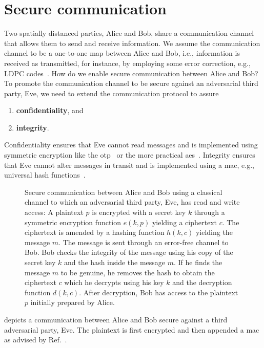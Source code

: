 \section{Secure communication}

Two spatially distanced parties, Alice and Bob, share a communication channel that allows them to send and receive information.
We assume the communication channel to be a one-to-one map between Alice and Bob, i.e., information is received as transmitted, for instance, by employing some error correction, e.g., LDPC codes~\cite{Gallager1962}.
How do we enable secure communication between Alice and Bob?
To promote the communication channel to be secure against an adversarial third party, Eve, we need to extend the communication protocol to assure
\begin{enumerate}
	\item \textbf{confidentiality}, and
	\item \textbf{integrity}.
\end{enumerate}
Confidentiality ensures that Eve cannot read messages and is implemented using symmetric encryption like the \gls{otp}~\cite{Shannon1949} or the more practical \gls{aes}~\cite{Daemen1999}.
Integrity ensures that Eve cannot alter messages in transit and is implemented using a \gls{mac}, e.g., universal hash functions~\cite{Carter1979}.
\begin{figure}[htb]
	\centering
	
	\caption{Secure communication between Alice and Bob using a classical channel to which an adversarial third party, Eve, has read and write access: A plaintext $p$ is encrypted with a secret key $k$ through a symmetric encryption function $e(k,p)$ yielding a ciphertext $c$. The ciphertext is amended by a hashing function $h(k,c)$ yielding the message $m$. The message is sent through an error-free channel to Bob. Bob checks the integrity of the message using his copy of the secret key $k$ and the hash inside the message $m$. If he finds the message $m$ to be genuine, he removes the hash to obtain the ciphertext $c$ which he decrypts using his key $k$ and the decryption function $d(k,c)$. After decryption, Bob has access to the plaintext $p$ initially prepared by Alice.}\label{fig:secure_communication}
\end{figure}
 depicts a communication between Alice and Bob secure against a third adversarial party, Eve.
The plaintext is first encrypted and then appended a \gls{mac} as advised by Ref.~\cite{Kohno2003,Krawczyk2001,Bellare2000}.

